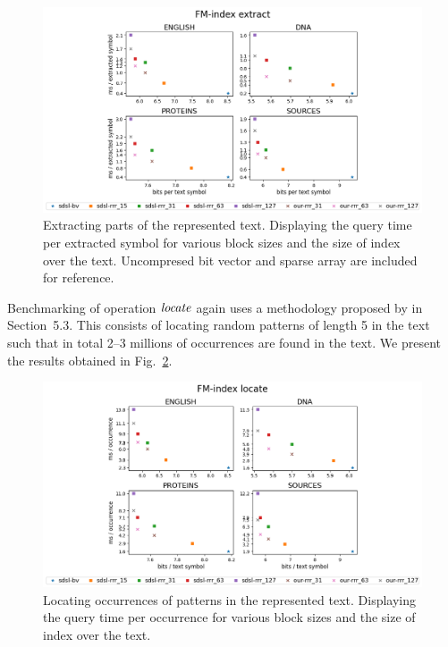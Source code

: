 \begin{figure}
	\centerline{
		\includegraphics[width=\textwidth, height=0.4\textheight]{images/vysledky_sdsl_extract}
	}
	\caption[TODO]{Extracting parts of the represented text. Displaying
	the query time per extracted symbol for various block sizes and the size of index over the
	text. Uncompresed bit vector and sparse array are included for reference. 
	}
	\label{obr:benchmark_sdsl_extract}
\end{figure}

Benchmarking of operation $\mathit{locate}$ again uses a methodology proposed by \cite{ferragina2009compressed} 
in Section~5.3. This consists of locating random patterns of length 5 in the text such
that in total 2--3 millions of occurrences are found in the text. We present the results
obtained in Fig.~\ref{obr:benchmark_sdsl_locate}.

\begin{figure}
	\centerline{
		\includegraphics[width=\textwidth, height=0.4\textheight]{images/vysledky_sdsl_locate}
	}
	\caption[TODO]{Locating occurrences of patterns in the represented text. Displaying
	the query time per occurrence for various block sizes and the size of index over the
	text.
	}
	\label{obr:benchmark_sdsl_locate}
\end{figure}

